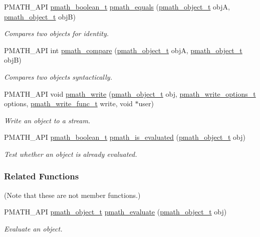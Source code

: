 \begin{CompactItemize}
PMATH\_\-API \hyperlink{group__general__types_g8e45b3972d0a6a89b2b45eb9eae6d8f7}{pmath\_\-boolean\_\-t} \hyperlink{group__objects_g8d82180ae5d4e23c396f83472fafa472}{pmath\_\-equals} (\hyperlink{classpmath__object__t}{pmath\_\-object\_\-t} objA, \hyperlink{classpmath__object__t}{pmath\_\-object\_\-t} objB)
\begin{CompactList}\small\item\em Compares two objects for identity. \item\end{CompactList}\item 
PMATH\_\-API int \hyperlink{group__objects_gb4695202fee8aa6460cf66f2a5c44c1e}{pmath\_\-compare} (\hyperlink{classpmath__object__t}{pmath\_\-object\_\-t} objA, \hyperlink{classpmath__object__t}{pmath\_\-object\_\-t} objB)
\begin{CompactList}\small\item\em Compares two objects syntactically. \item\end{CompactList}\item 
PMATH\_\-API void \hyperlink{group__objects_g91499064fabbd0f0f426130b488693ca}{pmath\_\-write} (\hyperlink{classpmath__object__t}{pmath\_\-object\_\-t} obj, \hyperlink{group__objects_gd83ea6a616c49cbe35b5d3dafb877f7e}{pmath\_\-write\_\-options\_\-t} options, \hyperlink{group__general__types_g781a2e0445795bb4e091470fb20497cc}{pmath\_\-write\_\-func\_\-t} write, void $\ast$user)
\begin{CompactList}\small\item\em Write an object to a stream. \item\end{CompactList}\item 
PMATH\_\-API \hyperlink{group__general__types_g8e45b3972d0a6a89b2b45eb9eae6d8f7}{pmath\_\-boolean\_\-t} \hyperlink{group__objects_gb6f2766f0ee3a00b3a36c32896c27c3e}{pmath\_\-is\_\-evaluated} (\hyperlink{classpmath__object__t}{pmath\_\-object\_\-t} obj)
\begin{CompactList}\small\item\em Test whether an object is already evaluated. \item\end{CompactList}\end{CompactItemize}
\subsubsection*{Related Functions}
(Note that these are not member functions.) \begin{CompactItemize}
\item 
PMATH\_\-API \hyperlink{classpmath__object__t}{pmath\_\-object\_\-t} \hyperlink{classpmath__object__t_adc70af9d7f05843d71d1fc4d3970621}{pmath\_\-evaluate} (\hyperlink{classpmath__object__t}{pmath\_\-object\_\-t} obj)
\begin{CompactList}\small\item\em Evaluate an object. \item\end{CompactList}\end{CompactItemize}


